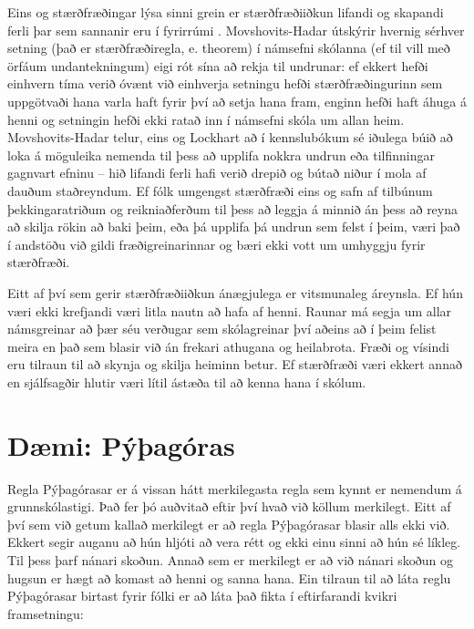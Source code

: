 \documentclass[
  icelandic,
]{book}
\theoremstyle{definition}
\theoremstyle{definition}
\theoremstyle{definition}
\theoremstyle{definition}
\theoremstyle{remark}
\begin{document}
Eins og stærðfræðingar lýsa sinni grein er stærðfræðiiðkun lifandi og skapandi ferli þar sem sannanir eru í fyrirrúmi \autocite{polya1990,su2020}. Movshovits-Hadar \autocite{movshovits-hadar1988} útskýrir hvernig sérhver setning (það er stærðfræðiregla, e. theorem) í námsefni skólanna (ef til vill með örfáum undantekningum) eigi rót sína að rekja til undrunar: ef ekkert hefði einhvern tíma verið óvænt við einhverja setningu hefði stærðfræðingurinn sem uppgötvaði hana varla haft fyrir því að setja hana fram, enginn hefði haft áhuga á henni og setningin hefði ekki ratað inn í námsefni skóla um allan heim. Movshovits-Hadar \autocite{movshovits-hadar1988} telur, eins og Lockhart að í kennslubókum sé iðulega búið að loka á möguleika nemenda til þess að upplifa nokkra undrun eða tilfinningar gagnvart efninu -- hið lifandi ferli hafi verið drepið og bútað niður í mola af dauðum staðreyndum. Ef fólk umgengst stærðfræði eins og safn af tilbúnum þekkingaratriðum og reikniaðferðum til þess að leggja á minnið án þess að reyna að skilja rökin að baki þeim, eða þá upplifa þá undrun sem felst í þeim, væri það í andstöðu við gildi fræðigreinarinnar og bæri ekki vott um umhyggju fyrir stærðfræði.

Eitt af því sem gerir stærðfræðiiðkun ánægjulega er vitsmunaleg áreynsla. Ef hún væri ekki krefjandi væri litla nautn að hafa af henni. Raunar má segja um allar námsgreinar að þær séu verðugar sem skólagreinar því aðeins að í þeim felist meira en það sem blasir við án frekari athugana og heilabrota. Fræði og vísindi eru tilraun til að skynja og skilja heiminn betur. Ef stærðfræði væri ekkert annað en sjálfsagðir hlutir væri lítil ástæða til að kenna hana í skólum.

\section{Dæmi: Pýþagóras}\label{pythagoras}

Regla Pýþagórasar er á vissan hátt merkilegasta regla sem kynnt er nemendum á grunnskólastigi. Það fer þó auðvitað eftir því hvað við köllum merkilegt. Eitt af því sem við getum kallað merkilegt er að regla Pýþagórasar blasir alls ekki við. Ekkert segir auganu að hún hljóti að vera rétt og ekki einu sinni að hún sé líkleg. Til þess þarf nánari skoðun. Annað sem er merkilegt er að við nánari skoðun og hugsun er hægt að komast að henni og sanna hana. Ein tilraun til að láta reglu Pýþagórasar birtast fyrir fólki er að láta það fikta í eftirfarandi kvikri framsetningu:
\end{document}
